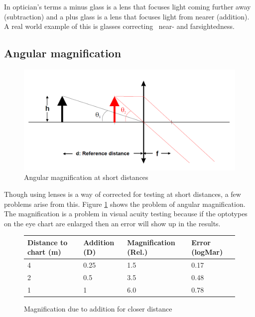 \documentclass[12pt,a4paper,notitlepage]{report}
\begin{document}
In optician's terms a minus glass is a lens that focuses light coming further away (subtraction) and a plus glass is a lens that focuses light from nearer (addition). A real world example of this is glasses correcting ~near- and farsightedness. \cite{Acuity_Book}

\subsection{Angular magnification}
\begin{figure}[h]
\centering
\includegraphics[width=120mm]{images/Angular_magnification.png}
\caption{Angular magnification at short distances\label{angular}}
\end{figure}

Though using lenses is a way of corrected for testing at short distances, a few problems arise from this. Figure \ref{angular} shows the problem of angular magnification. The magnification is a problem in visual acuity testing because if the optotypes on the eye chart are enlarged then an error will show up in the results.

\newpage
\begin{figure}[h]
\centering
\begin{tabular}{| l | l | l | l |}
    \hline
    Distance to chart (m) & Addition (D) & Magnification (Rel.) & Error (logMar) \\ \hline
    4                     & 0.25         & 1.5                  & 0.17           \\ \hline
    2                     & 0.5          & 3.5                  & 0.48           \\ \hline
    1                     & 1            & 6.0                  & 0.78           \\ 
    \hline
    \end{tabular}
    \caption{Magnification due to addition for closer distance\label{magtable}}
\end{figure}
\end{document}
